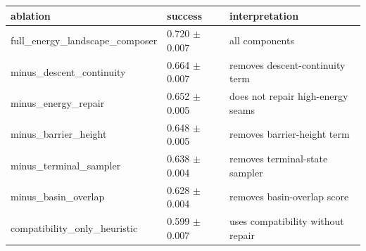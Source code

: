 \begin{tabular}{lll}
\toprule
ablation & success & interpretation \\
\midrule
full\_energy\_landscape\_composer & 0.720 $\pm$ 0.007 & all components \\
minus\_descent\_continuity & 0.664 $\pm$ 0.007 & removes descent-continuity term \\
minus\_energy\_repair & 0.652 $\pm$ 0.005 & does not repair high-energy seams \\
minus\_barrier\_height & 0.648 $\pm$ 0.005 & removes barrier-height term \\
minus\_terminal\_sampler & 0.638 $\pm$ 0.004 & removes terminal-state sampler \\
minus\_basin\_overlap & 0.628 $\pm$ 0.004 & removes basin-overlap score \\
compatibility\_only\_heuristic & 0.599 $\pm$ 0.007 & uses compatibility without repair \\
\bottomrule
\end{tabular}
